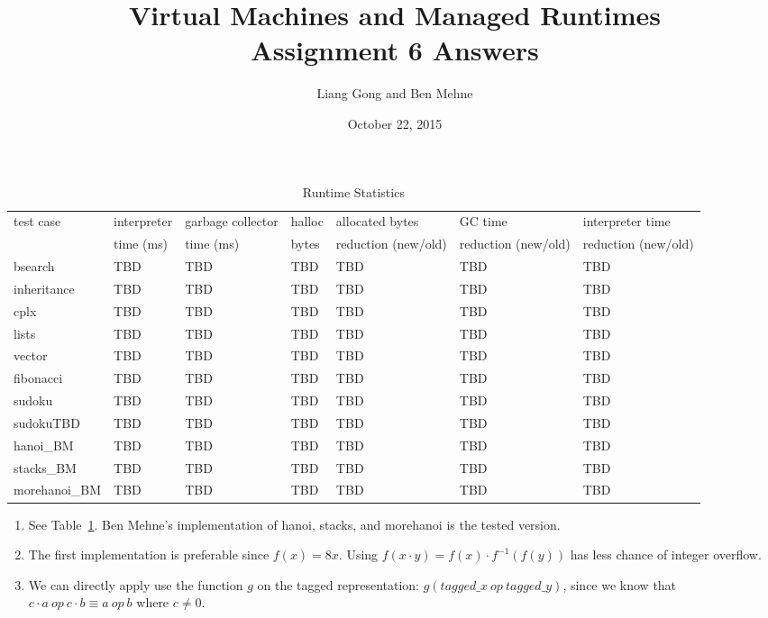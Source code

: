 \documentclass[notitlepage]{report}
\title{\vspace{-0.5in}Virtual Machines and Managed Runtimes \\ Assignment 6 Answers}
\date{\vspace{-0.5in}October 22, 2015}
\author{\vspace{-0.5in}Liang Gong and Ben Mehne\vspace{-0.5in}}
\newcommand{\code}[1]{{\ttfamily #1}}
\begin{document}
\maketitle

\begin{table}[!htp]
\centering
\caption{Runtime Statistics}
\label{statistics}
{\footnotesize
\begin{tabular}{lllllll}
\toprule
test case & interpreter & garbage collector & \code{halloc} & allocated bytes     & GC time             & interpreter time    \\
          & time (ms)   & time (ms)         & bytes         & reduction (new/old) & reduction (new/old) & reduction (new/old) \\
\midrule
bsearch        & TBD          & TBD          & TBD           & TBD          & TBD           & TBD           \\
inheritance    & TBD          & TBD          & TBD           & TBD          & TBD           & TBD           \\
cplx           & TBD          & TBD          & TBD           & TBD          & TBD           & TBD           \\
lists          & TBD          & TBD          & TBD           & TBD          & TBD           & TBD           \\
vector         & TBD          & TBD          & TBD           & TBD          & TBD           & TBD           \\
fibonacci      & TBD          & TBD          & TBD           & TBD          & TBD           & TBD           \\
sudoku         & TBD          & TBD          & TBD           & TBD          & TBD           & TBD           \\
sudokuTBD      & TBD          & TBD          & TBD           & TBD          & TBD           & TBD           \\
hanoi\_BM      & TBD          & TBD          & TBD           & TBD          & TBD           & TBD           \\
stacks\_BM     & TBD          & TBD          & TBD           & TBD          & TBD           & TBD           \\
morehanoi\_BM  & TBD          & TBD          & TBD           & TBD          & TBD           & TBD           \\

\bottomrule
\end{tabular}
}
\end{table}

\begin{enumerate}
	\item
		See Table~\ref{statistics}. Ben Mehne's implementation of hanoi, stacks, and morehanoi is the tested version.
	\item
		The first implementation is preferable since $f(x) = 8x$. Using $f(x \cdot y) = f(x) \cdot f^{-1}(f(y))$ has less chance
		of integer overflow.
	\item
		We can directly apply use the function $g$ on the tagged representation: $g (tagged\_x\ op\ tagged\_y)$, since we know that $c \cdot a\ op\ c \cdot b \equiv a\ op\ b$ where $c \neq 0$.
\end{enumerate}
\end{document}
